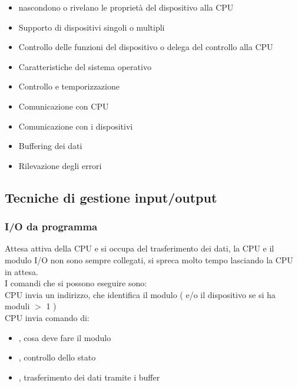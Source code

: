 \documentclass[arch.tex]{subfiles}
\begin{document}
%
\label{ppar:Caratteristiche Modulo I/O}


\begin{itemize}
	\item nascondono o rivelano le proprietà del dispositivo alla CPU
	\item Supporto di dispositivi singoli o multipli
	\item Controllo delle funzioni del dispositivo o delega del controllo alla CPU
	\item Caratteristiche del sistema operativo
\end{itemize}

%
\label{ppar:Funzioni del Modulo I/O}


\begin{itemize}
	\item Controllo e temporizzazione
	\item Comunicazione con CPU
	\item Comunicazione con i dispositivi
	\item Buffering dei dati
	\item Rilevazione degli errori
\end{itemize}
\subsection{Tecniche di gestione input/output}%
\label{sub:tecniche_di_gestione_input_output}

\subsubsection{I/O da programma}
Attesa attiva della CPU e si occupa del trasferimento dei dati, la CPU e il modulo
I/O non sono sempre collegati, si spreca molto tempo lasciando la CPU in attesa.\\
I comandi che si possono eseguire sono:\\
CPU invia un indirizzo, che identifica il modulo ( e/o il dispositivo se  si ha moduli $>$ 1 )\\ 
CPU invia comando di:
\begin{itemize}
  	\item {}, cosa deve fare il modulo
	\item {}, controllo dello stato
	\item {}, trasferimento dei dati tramite i buffer
\end{itemize}
\end{document}
